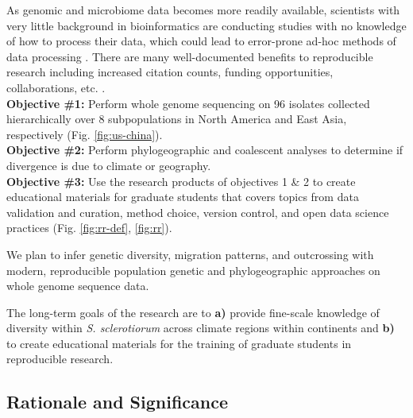 \documentclass[12pt,letterpaper]{article}
\begin{document}
As genomic and microbiome data becomes more readily available, scientists with very little background in bioinformatics are conducting studies with no knowledge of how to process their data, which could lead to error-prone ad-hoc methods of data processing \citep{stewart-lowndes2017path, barone2017unmet}. 
There are many well-documented benefits to reproducible research including increased citation counts, funding opportunities, collaborations, etc. \citep{mckiernan2016open,stewart-lowndes2017path}.\\
\textbf{Objective \#1:} Perform whole genome sequencing on 96 isolates collected hierarchically over 8 subpopulations in North America and East Asia, respectively (Fig. \ref{fig:us-china}).\\
\textbf{Objective \#2:} Perform phylogeographic and coalescent analyses to determine if divergence is due to climate or geography.\\
\textbf{Objective \#3:} Use the research products of objectives 1 \& 2 to create educational materials for graduate students that covers topics from
data validation and curation, method choice, version control, and open data science practices (Fig. \ref{fig:rr-def}, \ref{fig:rr}).

We plan to infer genetic diversity, migration patterns, and outcrossing with modern, reproducible population genetic and phylogeographic approaches on whole genome sequence data. 

The long-term goals of the research are to \textbf{a)} provide fine-scale knowledge of diversity within \textit{S. sclerotiorum} across climate regions within continents and \textbf{b)} to create educational materials for the training of graduate students in reproducible research. 




\subsection{Rationale and Significance}



\end{document}
